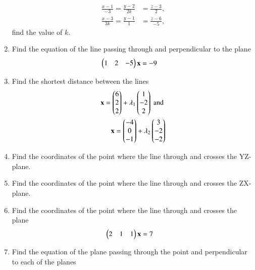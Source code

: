 \begin{enumerate}[label=\arabic*.,ref=\thesubsection.\theenumi]
\begin{align}
\frac{x-1}{-3} = \frac{y-2}{2k} &= \frac{z-3}{2}, 
\\
\frac{x-3}{3k} = \frac{y-1}{1} &= \frac{z-6}{-5} ,
\end{align}
find the value of $k$.
\item Find the  equation of the line passing through  and perpendicular to the plane %
\begin{align}
\begin{pmatrix}1 & 2 & -5\end{pmatrix}\mathbf{x}&=-9
\end{align}
\item Find the shortest distance between the lines 
%
\begin{align}
\mathbf{x} = \begin{pmatrix}6 \\ 2 \\ 2\end{pmatrix} + \lambda_1 \begin{pmatrix}1 \\ -2 \\ 2\end{pmatrix}  \text{ and }
\\
\mathbf{x} = \begin{pmatrix}-4 \\ 0 \\ -1\end{pmatrix} + \lambda_2 \begin{pmatrix}3 \\ -2 \\ -2\end{pmatrix}  
\end{align}
%
\item Find the coordinates of the point where the line through  and  crosses the YZ-plane.
\item Find the coordinates of the point where the line through  and  crosses the ZX-plane.
\item Find the coordinates of the point where the line through  and  crosses the plane 
\begin{align}
\begin{pmatrix}2 & 1 & 1\end{pmatrix}\mathbf{x}&=7
\end{align}
%
\item Find the equation of the plane passing through the point  and perpendicular to each of the planes 

\end{enumerate}
